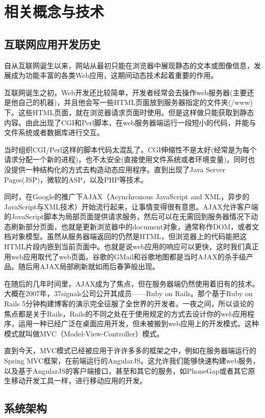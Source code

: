 
\chapter{相关概念与技术}
\section{互联网应用开发历史}
自从互联网诞生以来，网站从最初只能在浏览器中展现静态的文本或图像信息，发展成为功能丰富的各类Web应用，这期间动态技术起着重要的作用。

互联网诞生之初，Web开发还比较简单，开发者经常会去操作web服务器(主要还是他自己的机器)，并且他会写一些HTML页面放到服务器指定的文件夹(/www)下。这些HTML页面，就在浏览器请求页面时使用。但是这样做只能获取到静态内容。由此出现了CGI和Perl脚本，在web服务器端运行一段短小的代码，并能与文件系统或者数据库进行交互。

当时组织CGI/Perl这样的脚本代码太混乱了。CGI伸缩性不是太好(经常是为每个请求分配一个新的进程)，也不太安全(直接使用文件系统或者环境变量)，同时也没提供一种结构化的方式去构造动态应用程序。直到出现了Java Server Pages(JSP)，微软的ASP，以及PHP等技术。

同时，在Google的推广下AJAX（Asynchronous JavaScript and XML，异步的JavaScript与XML技术）开始流行起来，让事情变得很有意思。AJAX允许客户端的JavaScript脚本为局部页面提供请求服务，然后可以在无需回到服务器情况下动态刷新部分页面，也就是更新浏览器中的document对象，通常称作DOM，或者文档对象模型。虽然从服务器端返回的仍然是HTML，但浏览器上的代码能把这HTML片段内嵌到当前页面中。也就是说web应用的响应可以更快，这时我们真正用web应用取代了web页面。谷歌的GMail和谷歌地图都是当时AJAX的杀手级产品。随后用AJAX局部刷新就如雨后春笋般出现。

在随后的几年时间里，AJAX成为了焦点，但在服务器端仍然使用着旧有的技术。大概在2007年，37signals公司公开其成员——Ruby on Rails。那个基于Ruby on Rails 5分钟构建博客的演示完全征服了全世界的开发者。一夜之间，所以谈论的焦点都是关于Rails，Rails的不同之处在于使用规定的方式去设计你的web应用程序，运用一种已经广泛在桌面应用开发，但未被搬到web应用上的开发模式。这种模式就叫做MVC（Model-View-Controller）模式。

直到今天，MVC模式已经被应用于许许多多的框架之中，例如在服务器端运行的Spring MVC框架，在前端运行的AngularJS。这允许我们能够快速构建web服务，以及基于AngularJS的客户端接口，甚至和其它的服务，如PhoneGap或者其它原生移动开发工具一样，进行移动应用的开发。

\section{系统架构}
